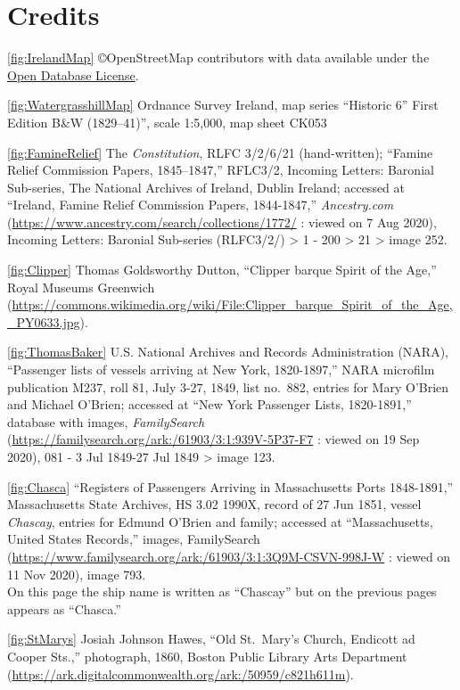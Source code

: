 
\section{Credits}
\raggedright
\setlength{\parskip}{1em}

\ref{fig:IrelandMap} \copyright OpenStreetMap contributors with data available under the \href{https://www.openstreetmap.org/copyright}{Open Database License}.

\ref{fig:WatergrasshillMap} Ordnance Survey Ireland, map series ``Historic 6'' First Edition B\&W (1829--41)'', scale 1:5,000, map sheet CK053

\ref{fig:FamineRelief} The \textit{Constitution}, RLFC 3/2/6/21 (hand-written); ``Famine Relief Commission Papers, 1845–1847,'' RFLC3/2, Incoming Letters: Baronial Sub-series, The National Archives of Ireland, Dublin Ireland;
accessed at ``Ireland, Famine Relief Commission Papers, 1844-1847,'' \textit{Ancestry.com} (\url{https://www.ancestry.com/search/collections/1772/} : viewed on 7 Aug 2020), Incoming Letters: Baronial Sub-series (RLFC3/2/) > 1 - 200 > 21 > image 252.

\ref{fig:Clipper} Thomas Goldsworthy Dutton, ``Clipper barque Spirit of the Age,'' Royal Museums Greenwich (\url{https://commons.wikimedia.org/wiki/File:Clipper_barque_Spirit_of_the_Age,_PY0633.jpg}).

\ref{fig:ThomasBaker} U.S. National Archives and Records Administration (NARA), ``Passenger lists of vessels arriving at New York, 1820-1897,'' NARA microfilm publication M237, roll 81, July 3-27, 1849, list no.\ 882, entries for Mary O'Brien and Michael O'Brien; accessed at ``New York Passenger Lists, 1820-1891,'' database with images, \textit{FamilySearch} (\url{https://familysearch.org/ark:/61903/3:1:939V-5P37-F7} : viewed on 19 Sep 2020), 081 - 3 Jul 1849-27 Jul 1849 > image 123.

\ref{fig:Chasca} ``Registers of Passengers Arriving in Massachusetts Ports 1848-1891,'' Massachusetts State Archives, HS 3.02 1990X, record of 27 Jun 1851, vessel \textit{Chascay}, entries for Edmund O'Brien and family; accessed at ``Massachusetts, United States Records,'' images, FamilySearch (\url{https://www.familysearch.org/ark:/61903/3:1:3Q9M-CSVN-998J-W} : viewed on 11 Nov 2020), image 793.\\
On this page the ship name is written as ``Chascay'' but on the previous pages appears as ``Chasca.''

\ref{fig:StMarys} Josiah Johnson Hawes, ``Old St.\ Mary's Church, Endicott ad Cooper Sts.,'' photograph, 1860, Boston Public Library Arts Department (\url{https://ark.digitalcommonwealth.org/ark:/50959/c821h611m}).

